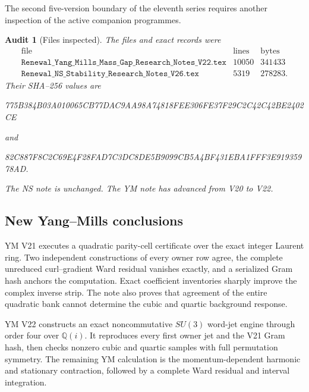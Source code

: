 \documentclass[11pt]{article}
\newtheorem{audit}[theorem]{Audit}
\begin{document}
The second five-version boundary of the eleventh series requires another
inspection of the active companion programmes.

\begin{audit}[Files inspected]
\label{audit:v11v10-files}
The files and exact records were
\[
\begin{array}{c|r|r}
\text{file}&\text{lines}&\text{bytes}\\ \hline
\texttt{Renewal\_Yang\_Mills\_Mass\_Gap\_Research\_Notes\_V22.tex}
&10050&341433\\
\texttt{Renewal\_NS\_Stability\_Research\_Notes\_V26.tex}
&5319&278283.
\end{array}
\]
Their SHA--256 values are
\begin{center}
\small\ttfamily
775B384B03A010065CB77DAC9AA98A74818FEE306FE37F29C2C42C42BE2402CE
\end{center}
and
\begin{center}
\small\ttfamily
82C887F8C2C69E4F28FAD7C3DC8DE5B9099CB5A4BF431EBA1FFF3E91935978AD.
\end{center}
The NS note is unchanged.  The YM note has advanced from V20 to V22.
\end{audit}

\subsection{New Yang--Mills conclusions}

YM V21 executes a quadratic parity-cell certificate over the exact integer
Laurent ring.  Two independent constructions of every owner row agree,
the complete unreduced curl--gradient Ward residual vanishes exactly, and
a serialized Gram hash anchors the computation.  Exact coefficient
inventories sharply improve the complex inverse strip.  The note also
proves that agreement of the entire quadratic bank cannot determine the
cubic and quartic background response.

YM V22 constructs an exact noncommutative \(SU(3)\) word-jet engine through
order four over \(\mathbb Q(i)\).  It reproduces every first owner jet and
the V21 Gram hash, then checks nonzero cubic and quartic samples with full
permutation symmetry.  The remaining YM calculation is the
momentum-dependent harmonic and stationary contraction, followed by a
complete Ward residual and interval integration.
\end{document}
